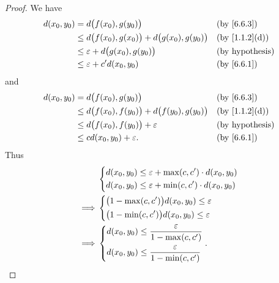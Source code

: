 \begin{proof}
  We have
  \begin{align*}
    d(x_0, y_0) & = d\big(f(x_0), g(y_0)\big)                                &  & \by{6.6.3}                  \\
                & \leq d\big(f(x_0), g(x_0)\big) + d\big(g(x_0), g(y_0)\big) &  & \text{(by \cref{1.1.2}(d))} \\
                & \leq \varepsilon + d\big(g(x_0), g(y_0)\big)               &  & \text{(by hypothesis)}      \\
                & \leq \varepsilon + c' d(x_0, y_0)                          &  & \by{6.6.1}
  \end{align*}
  and
  \begin{align*}
    d(x_0, y_0) & = d\big(f(x_0), g(y_0)\big)                                &  & \by{6.6.3}                  \\
                & \leq d\big(f(x_0), f(y_0)\big) + d\big(f(y_0), g(y_0)\big) &  & \text{(by \cref{1.1.2}(d))} \\
                & \leq d\big(f(x_0), f(y_0)\big) + \varepsilon               &  & \text{(by hypothesis)}      \\
                & \leq c d(x_0, y_0) + \varepsilon.                          &  & \by{6.6.1}
  \end{align*}
  Thus
  \begin{align*}
             & \begin{dcases}
                 d(x_0, y_0) \leq \varepsilon + \max(c, c') \cdot d(x_0, y_0) \\
                 d(x_0, y_0) \leq \varepsilon + \min(c, c') \cdot d(x_0, y_0)
               \end{dcases} \\
    \implies & \begin{dcases}
                 \big(1 - \max(c, c')\big) d(x_0, y_0) \leq \varepsilon \\
                 \big(1 - \min(c, c')\big) d(x_0, y_0) \leq \varepsilon
               \end{dcases}       \\
    \implies & \begin{dcases}
                 d(x_0, y_0) \leq \dfrac{\varepsilon}{1 - \max(c, c')} \\
                 d(x_0, y_0) \leq \dfrac{\varepsilon}{1 - \min(c, c')}
               \end{dcases}.
  \end{align*}
\end{proof}